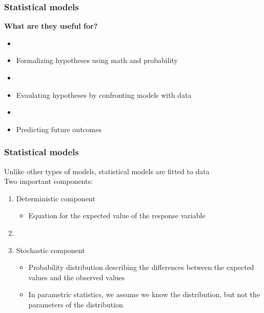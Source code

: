\documentclass[color=usenames,dvipsnames]{beamer}\usepackage[]{graphicx}\usepackage[]{color}
\begin{document}
\begin{frame}
  \frametitle{Statistical models}
  \large
  {\bf What are they \alert{useful} for?}
  \begin{itemize}%
    \item[]
    \item<2-> Formalizing hypotheses using math and probability
    \item[]
    \item<3-> Evaulating hypotheses by confronting models with data
    \item[]
    \item<4-> Predicting future outcomes
  \end{itemize}
\end{frame}




\begin{frame}
  \frametitle{Statistical models}
  \large
  {Unlike other types of models, statistical models are fitted to data \\}
  \pause
  \vspace{12pt} %
  {Two important components: \\}
  \vspace{6pt}
  \begin{enumerate}
    \large
    \item<1-> Deterministic component%
      \begin{itemize}
        \normalsize
        \item Equation for the expected value of the response
          variable %
      \end{itemize}
    \item[]
    \item<2-> Stochastic component %
      \begin{itemize}
        \normalsize
        \item Probability distribution %
          describing the differences
          between the expected values and the observed values
        \item In parametric statistics, we assume we know the
          distribution, but not the parameters of the distribution
      \end{itemize}
  \end{enumerate}
\end{frame}
\end{document}
